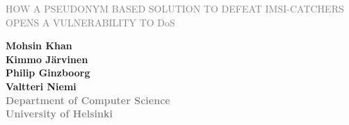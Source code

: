 \documentclass[portrait,a0]{a0poster}
\begin{document}



\begin{multicols}{2} 
\begin{minipage}[t]{1.4\linewidth}
\vspace{10pt}
\begin{flushleft}
\begin{spacing}{5}
{\Huge{}\textcolor{gray}{\MakeUppercase{How a Pseudonym Based Solution to Defeat IMSI-catchers Opens a Vulnerability to} DoS} \MakeUppercase{}} \\

\end{spacing}
\end{flushleft}
\end{minipage}

\begin{minipage}[t]{.95\linewidth} %
\vspace{-90pt} %
\begin{flushright}
\textsf{\bfseries
Mohsin Khan \\
Kimmo Järvinen\\
Philip Ginzboorg\\
Valtteri Niemi\\
} %
\textcolor{gray}{\textsf{\bfseries{Department of Computer Science\\University of Helsinki}}}
\end{flushright}
\end{minipage}
\end{multicols}

\vspace{-70pt}
\noindent\makebox[\linewidth]{\rule{\paperwidth}{5pt}}
\end{document}

